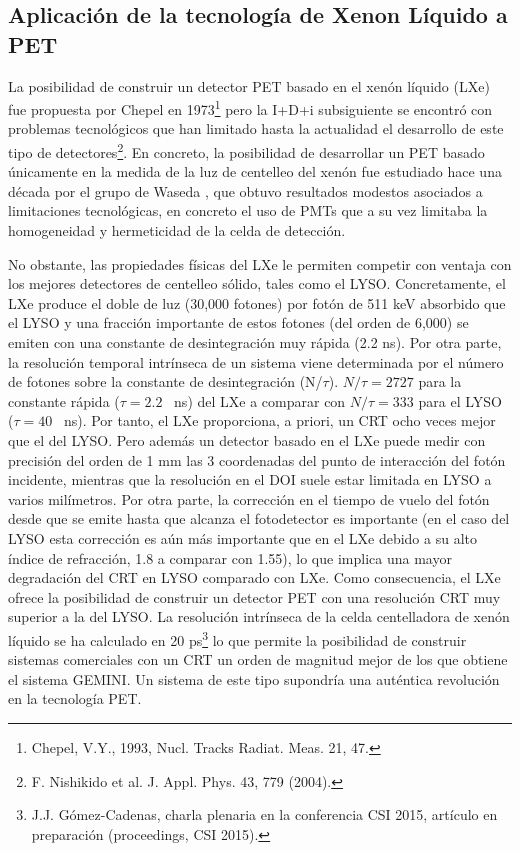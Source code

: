 \subsection*{Aplicación de la tecnología de Xenon Líquido a PET}

La posibilidad de construir un detector PET basado en el xenón líquido (LXe) fue propuesta por Chepel en 1973\footnote{Chepel, V.Y., 1993, Nucl. Tracks Radiat. Meas. 21, 47.}  pero la I+D+i subsiguiente se encontró con problemas tecnológicos que han limitado hasta la actualidad el desarrollo de este tipo de detectores\footnote{F. Nishikido et al. J. Appl. Phys. 43, 779 (2004).}. En concreto, la posibilidad de desarrollar un PET basado únicamente en la medida de la luz de centelleo del xenón fue estudiado hace una década por el grupo de Waseda , que obtuvo resultados modestos asociados a limitaciones tecnológicas, en concreto el uso de PMTs que a su vez limitaba la homogeneidad y hermeticidad de la celda de detección. 

No obstante, las propiedades físicas del LXe le permiten competir con ventaja con los mejores detectores de centelleo sólido, tales como el LYSO. Concretamente, el LXe produce el doble de luz (30,000 fotones) por fotón de 511 keV absorbido que el LYSO y una fracción importante de estos fotones (del orden de 6,000) se emiten con una constante de desintegración muy rápida (2.2 ns). Por otra parte, la resolución temporal intrínseca de un sistema viene determinada por el número de fotones sobre la constante de desintegración (N/$\tau$). $N/\tau =2727$ para la constante rápida ($\tau = 2.2$~ ns) del LXe a comparar con $N/\tau =333$ para el LYSO ($\tau = 40$~ ns). Por tanto, el LXe proporciona, a priori, un CRT ocho veces mejor que el del LYSO. Pero además un detector basado en el LXe puede medir con precisión del orden de 1 mm las 3 coordenadas del punto de interacción del fotón incidente, mientras que la resolución en el DOI suele estar limitada en LYSO a varios milímetros. Por otra parte, la corrección en el tiempo de vuelo del fotón desde que se emite hasta que alcanza el fotodetector es importante (en el caso del LYSO esta corrección es aún más importante que en el LXe debido a su alto índice de refracción, 1.8 a comparar con 1.55), lo que implica una mayor degradación del CRT en LYSO comparado con LXe. Como consecuencia, el LXe ofrece la posibilidad de construir un detector PET con una resolución CRT muy superior a la del LYSO. La resolución intrínseca de la celda centelladora de xenón líquido  se ha calculado en 20 ps\footnote{J.J. Gómez-Cadenas, charla plenaria en la conferencia CSI 2015, artículo en preparación (proceedings, CSI 2015). }  lo que permite la posibilidad de construir sistemas comerciales con un CRT un orden de magnitud mejor de los que obtiene el sistema GEMINI. Un sistema de este tipo supondría una auténtica revolución en la tecnología PET.


